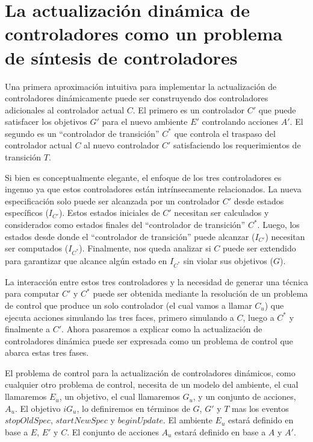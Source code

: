 \section{La actualización dinámica de controladores como un problema de síntesis de controladores}

Una primera aproximación intuitiva para implementar la actualización de controladores dinámicamente puede ser
construyendo dos controladores adicionales al controlador actual $C$. El primero es un controlador $C'$ que puede
satisfacer los objetivos $G'$ para el nuevo ambiente $E'$ controlando acciones $A'$. El segundo es un ``controlador de
transición'' $C^*$ que controla el traspaso del controlador actual $C$ al nuevo controlador $C'$ satisfaciendo los
requerimientos de transición $T$.

Si bien es conceptualmente elegante, el enfoque de los tres controladores es ingenuo ya que estos controladores están
intrínsecamente relacionados. La nueva especificación solo puede ser alcanzada por un controlador $C'$ desde estados
específicos ($I_{C'}$). Estos estados iniciales de $C'$ necesitan ser calculados y considerados como estados finales del
``controlador de transición'' $C^*$. Luego, los estados desde donde el ``controlador de transición'' puede alcanzar
($I_{C'}$) necesitan ser computados ($I_{C^*}$). Finalmente, nos queda analizar si $C$ puede ser extendido para
garantizar que alcance algún estado en $I_{C^*}$ sin violar sus objetivos ($G$).

La interacción entre estos tres controladores y la necesidad de generar una técnica para computar $C'$ y $C^*$ puede ser
obtenida mediante la resolución de un problema de control que produce un solo controlador (el cual vamos a llamar $C_u$)
que ejecuta acciones simulando las tres faces, primero simulando a $C$, luego a $C^*$ y finalmente a $C'$. Ahora
pasaremos a explicar como la actualización de controladores dinámica puede ser expresada como un problema de control que
abarca estas tres fases.

El problema de control para la actualización de controladores dinámicos, como cualquier otro problema de control,
necesita de un modelo del ambiente, el cual llamaremos $E_u$, un objetivo, el cual llamaremos $G_u$, y un conjunto de
acciones, $A_u$. El objetivo $iG_u$, lo definiremos en términos de $G$, $G'$ y $T$ mas los eventos $stopOldSpec$,
$startNewSpec$ y $beginUpdate$. El ambiente $E_u$ estará definido en base a $E$, $E'$ y $C$. El conjunto de acciones
$A_u$ estará definido en base a $A$ y $A'$.


